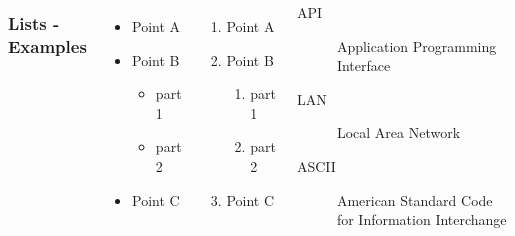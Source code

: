 \documentclass[english,landscape,xcolor=dvipsnames,aspectratio=169]{beamer}
\begin{document}
	
\begin{frame}
\begin{columns}
\frametitle{Lists - Examples}
\begin{itemize}
\item Point A
\item Point B
\begin{itemize}
\item part 1
\item part 2
\end{itemize}
\item Point C
\end{itemize}

\begin{enumerate}[I]
\item Point A
\item Point B
\begin{enumerate}[i]
\item part 1
\item part 2
\end{enumerate}
\item Point C
\end{enumerate}
\begin{description}
\item[API] Application Programming Interface
\item[LAN] Local Area Network
\item[ASCII] American Standard Code for Information Interchange
\end{description}

\end{columns}
\end{frame}
\end{document}
